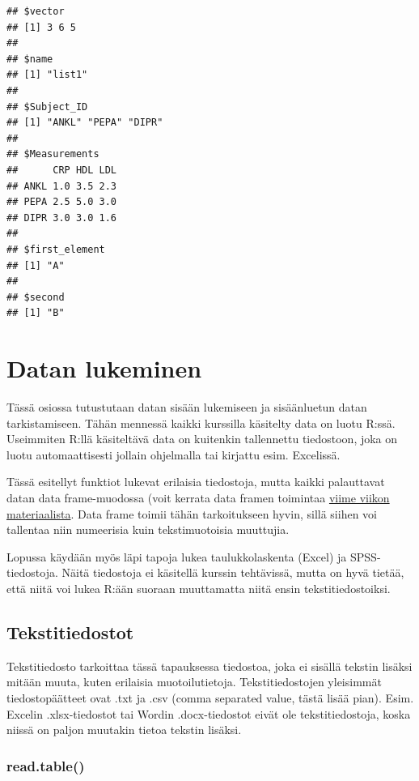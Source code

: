 \documentclass[
]{book}
\begin{document}
\begin{verbatim}
## $vector
## [1] 3 6 5
## 
## $name
## [1] "list1"
## 
## $Subject_ID
## [1] "ANKL" "PEPA" "DIPR"
## 
## $Measurements
##      CRP HDL LDL
## ANKL 1.0 3.5 2.3
## PEPA 2.5 5.0 3.0
## DIPR 3.0 3.0 1.6
## 
## $first_element
## [1] "A"
## 
## $second
## [1] "B"
\end{verbatim}

\hypertarget{reading_data}{%
\chapter{Datan lukeminen}\label{reading_data}}

Tässä osiossa tutustutaan datan sisään lukemiseen ja sisäänluetun datan tarkistamiseen. Tähän mennessä kaikki kurssilla käsitelty data on luotu R:ssä. Useimmiten R:llä käsiteltävä data on kuitenkin tallennettu tiedostoon, joka on luotu automaattisesti jollain ohjelmalla tai kirjattu esim. Excelissä.

Tässä esitellyt funktiot lukevat erilaisia tiedostoja, mutta kaikki palauttavat datan data frame-muodossa (voit kerrata data framen toimintaa \protect\hyperlink{data-frame}{viime viikon materiaalista}. Data frame toimii tähän tarkoitukseen hyvin, sillä siihen voi tallentaa niin numeerisia kuin tekstimuotoisia muuttujia.

Lopussa käydään myös läpi tapoja lukea taulukkolaskenta (Excel) ja SPSS-tiedostoja. Näitä tiedostoja ei käsitellä kurssin tehtävissä, mutta on hyvä tietää, että niitä voi lukea R:ään suoraan muuttamatta niitä ensin tekstitiedostoiksi.

\hypertarget{tekstitiedostot}{%
\section{Tekstitiedostot}\label{tekstitiedostot}}

Tekstitiedosto tarkoittaa tässä tapauksessa tiedostoa, joka ei sisällä tekstin lisäksi mitään muuta, kuten erilaisia muotoilutietoja. Tekstitiedostojen yleisimmät tiedostopäätteet ovat .txt ja .csv (comma separated value, tästä lisää pian). Esim. Excelin .xlsx-tiedostot tai Wordin .docx-tiedostot eivät ole tekstitiedostoja, koska niissä on paljon muutakin tietoa tekstin lisäksi.

\hypertarget{read.table}{%
\subsection{read.table()}\label{read.table}}
\end{document}
